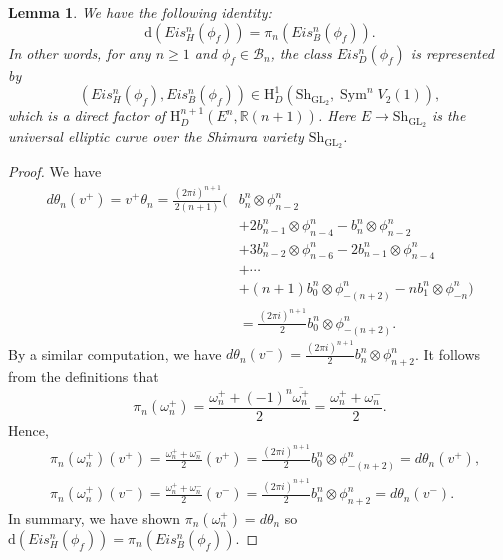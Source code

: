 \documentclass[11pt, a4paper]{amsart}
\theoremstyle{plain}
\newtheorem{lemma}[theorem]{Lemma}
\theoremstyle{definition}
\numberwithin{equation}{section}
\def\RR{\mathbb{R}}
\DeclareMathOperator{\Sym}{Sym}
\DeclareMathOperator{\GL}{\mathrm{GL}}
\newcommand{\Sh}{\mathrm{Sh}}
\begin{document}
\begin{lemma}\textnormal{\cite[(6.3.5)]{Kings98}}
\label{Lemma: Delgine representative of Eisenstein symbol}
    We have the following identity: 
    \begin{equation*}
        \mathrm{d}(Eis_{H}^{n}(\phi_f)) = \pi_{n} (Eis_{B}^{n}(\phi_f)). 
    \end{equation*}
    In other words, for any $n \ge 1$ and $\phi_{f} \in \mathcal{B}_{n}$, the class $Eis_{D}^{n}(\phi_f)$ is represented by 
    \begin{equation*}
        (Eis_{H}^{n}(\phi_f), Eis_{B}^{n}(\phi_f)) \in \mathrm{H}_{D}^{1}(\Sh_{\GL_2}, \Sym^{n} V_{2}(1)), 
    \end{equation*}
    which is a direct factor of $\mathrm{H}_{D}^{n + 1}(E^{n}, \RR(n + 1))$. Here $E \rightarrow \Sh_{\GL_2}$ is the universal elliptic curve over the Shimura variety $\Sh_{\GL_2}$.
\end{lemma}

\begin{proof}
    We have 
    \begin{align*}
        d\theta_n(v^{+}) = v^{+}\theta_n = \frac{(2\pi{i})^{n+1}}{2(n + 1)} ( & b^{n}_{n} \otimes \phi^{n}_{n - 2} \\
                                                                       & + 2 b^{n}_{n - 1} \otimes \phi^{n}_{n - 4} - b^{n}_{n} \otimes \phi^{n}_{n - 2} \\
                                                                       & + 3 b^{n}_{n - 2} \otimes \phi^{n}_{n - 6} - 2 b^{n}_{n-1} \otimes \phi^{n}_{n - 4} \\
                                                                       & + \cdots \\
                                                                       & + (n + 1) b^{n}_{0} \otimes \phi^{n}_{-(n + 2)} - n b^{n}_{1} \otimes \phi^{n}_{-n}) \\
                                         & = \frac{(2\pi{i})^{n+1}}{2 } b^{n}_{0} \otimes \phi^{n}_{-(n + 2)}. 
    \end{align*}
    By a similar computation, we have $d\theta_{n}(v^{-}) = \frac{(2\pi{i})^{n + 1}}{2} b^{n}_{n} \otimes \phi^{n}_{n + 2}$. 
    It follows from the definitions that 
    \begin{equation*}
        \pi_n(\omega^{+}_{n}) = \frac{\omega_{n}^{+} + (-1)^{n}\overline{\omega_{n}^{+}}}{2} = \frac{\omega_{n}^{+} + {\omega_{n}^{-}}}{2}. 
    \end{equation*}
    Hence, 
    \begin{align*}
        & \pi_n(\omega^{+}_{n})(v^{+}) = \frac{\omega_{n}^{+} + {\omega_{n}^{-}}}{2}(v^{+}) = \frac{(2\pi{i})^{n+1}}{2 } b^{n}_{0} \otimes \phi^{n}_{-(n + 2)} = d\theta_n(v^{+}),  \\
        & \pi_n(\omega^{+}_{n})(v^{-}) = \frac{\omega_{n}^{+} + {\omega_{n}^{-}}}{2}(v^{-}) = \frac{(2\pi{i})^{n+1}}{2 } b^{n}_{n} \otimes \phi^{n}_{n + 2} = d\theta_{n}(v^{-}). 
    \end{align*}
    In summary, we have shown $\pi_n(\omega_n^{+}) = d\theta_n$ so $\mathrm{d}(Eis_{H}^{n}(\phi_f)) = \pi_{n} (Eis_{B}^{n}(\phi_f))$. 
\end{proof}
\end{document}
